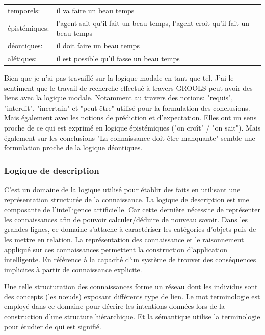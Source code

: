 \begin{refsegment}
    \begin{tabular}{ll}
        temporels:      & il va faire un beau temps \\
        épistémiques:   & l'agent sait qu'il fait un beau temps,  l'agent croit qu'il fait un beau temps \\
        déontiques:     & il doit faire un beau temps \\
        alétiques:      & il est possible qu'il fasse un beau temps \\
    \end{tabular}

    Bien que je n'ai pas travaillé sur la logique modale en tant que tel. J'ai le sentiment que le travail de recherche effectué à travers GROOLS peut avoir des liens avec la logique modale. Notamment au travers des notions: "requis", "interdit", "incertain" et "peut être" utilisé pour la formulation des conclusions. Mais également avec les notions de prédiction et d'expectation. Elles ont un sens proche de ce qui est exprimé en logique épistémiques ("on croît" / "on sait"). Mais également sur les conclusions "La connaissance doit être manquante" semble une formulation proche de la logique déontiques.
    
    
    
    \subsubsection{Logique de description}
    
    C'est un domaine de la logique utilisé pour établir des faits en utilisant une représentation structurée de la connaissance. La logique de description est une composante de l'intelligence artificielle. Car cette dernière nécessite de représenter les connaissances afin de pouvoir calculer/déduire de nouveau savoir. Dans les grandes lignes, ce domaine s'attache à caractériser les catégories d'objets puis de les mettre en relation. La représentation des connaissance et le raisonnement appliqué sur ces connaissances permettent la construction d'application intelligente. En référence à la capacité d'un système de trouver des conséquences implicites à partir de connaissance explicite.
    
    Une telle structuration des connaissances forme un réseau dont les individus sont des concepts (les nœuds) exposant différents type de lien. Le mot terminologie est employé dans ce domaine pour décrire les intentions données lors de la construction d'une structure hiérarchique. Et la sémantique utilise la terminologie pour étudier de qui est signifié.
    

\end{refsegment}
